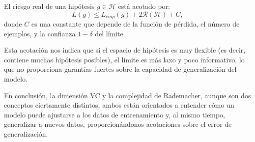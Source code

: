 \begin{teorema}
    El riesgo real de una hipótesis $ g \in \mathcal{H} $ está acotado por:
    \[
        L(g) \leq L_{emp}(g) + 2 \mathcal{R}(\mathcal{H}) + C,
    \]
    donde $ C $ es una constante que depende de la función de pérdida, el número de ejemplos, y la confianza $ 1 - \delta $ del límite.
\end{teorema}

Esta acotación nos indica que si el espacio de hipótesis es muy flexible (es decir, contiene muchas hipótesis posibles), el límite es más laxo y poco informativo, lo que no proporciona garantías fuertes sobre la capacidad de generalización del modelo.

En conclusión, la dimensión VC y la complejidad de Rademacher, aunque son dos conceptos ciertamente distintos, ambos están orientados a entender cómo un modelo puede ajustarse a los datos de entrenamiento y, al mismo tiempo, generalizar a nuevos datos, proporcionándonos acotaciones sobre el error de generalización.

\endinput
